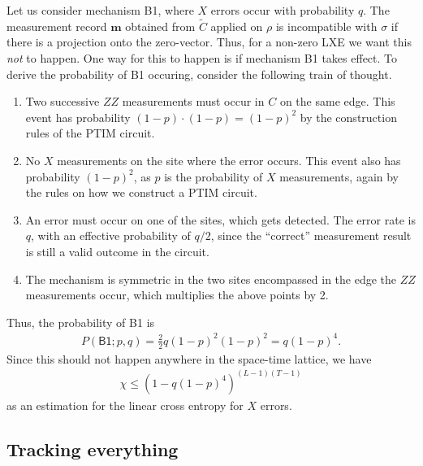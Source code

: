 Let us consider mechanism \textsf{B1}, where $X$ errors occur with probability
$q$.
The measurement record $\mathbf{m}$ obtained from $\tilde{C}$ applied on $\rho$
is incompatible with $\sigma$ if there is a projection onto the zero-vector.
Thus, for a non-zero LXE we want this \emph{not} to happen. One way for this to happen
is if mechanism \textsf{B1} takes effect. To derive the probability of
\textsf{B1} occuring, consider the following train of thought.

\begin{enumerate}
  \item Two successive $ZZ$ measurements must occur in $C$ on the same edge. This event has probability
    $(1-p)\cdot (1-p)= (1-p)^2$ by the construction rules of the PTIM circuit.
  \item No $X$ measurements on the site where the error occurs. This event also
    has probability $(1-p)^2$, as $p$ is the probability of $X$ measurements,
    again by the rules on how we construct a PTIM circuit.
  \item An error must occur on one of the sites, which gets detected. The error
    rate is $q$, with an effective probability of $q /2$, since the
    \enquote{correct} measurement result is still a valid outcome in the
    circuit.
  \item The mechanism is symmetric in the two sites encompassed in the edge the
    $ZZ$ measurements occur, which multiplies the above points by 2.
\end{enumerate}

Thus, the probability of \textsf{B1} is
\begin{align}
  P(\textsf{B1}; p,q) = \frac{2}{2} q \left(1-p\right)^2\left(1-p\right)^2 = q\left(
  1-p\right)^4
.\end{align}
Since this should not happen anywhere in the space-time lattice, we have
\begin{align}\label{eq:lxe-estimate}
      \chi \leq \left( 1-q\left( 1-p \right)^4  \right)^{(L-1)(T-1)}
\end{align}
as an estimation for the linear cross entropy for $X$ errors.

\subsection{Tracking everything}

